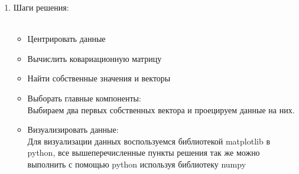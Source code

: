 \begin{enumerate}
   \item Шаги решения:\\\
   \begin{itemize} 
       \item Центрировать данные \\
       \item Вычислить ковариационную матрицу \\
       \item Найти собственные значения и векторы \\ 
       \item Выборать главные компоненты: \\
        Выбираем два первых собственных вектора и проецируем данные на них.
       \item Визуализировать данные: \\
       Для визуализации данных воспользуемся библиотекой matplotlib в python, все вышеперечисленные пункты решения так же можно выполнить с помощью python используя библиотеку numpy       
   \end{itemize}
\end{enumerate}